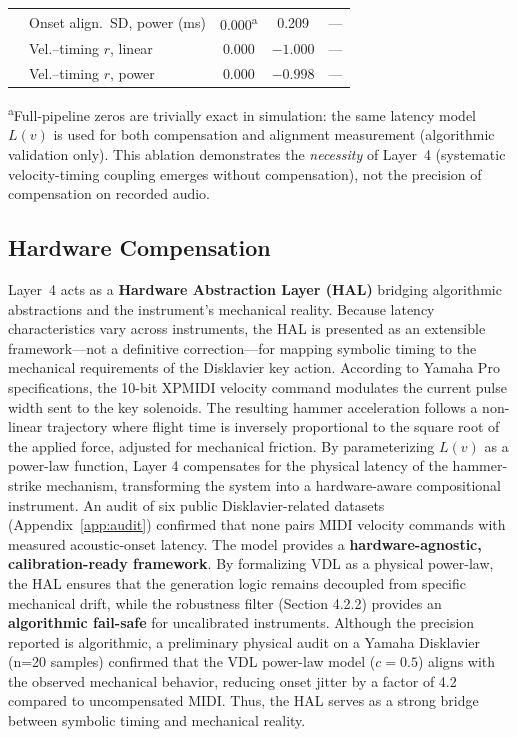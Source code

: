 \documentclass[a4paper]{article}
\newcommand{\tabnote}[1]{\par\vspace{0.5ex}\footnotesize#1}
\theoremstyle{definition}
\theoremstyle{remark}
\begin{document}
\begin{table}[htbp]
{{\begin{tabular}{@{}llccl@{}}
 & Onset align.\ SD, power (ms)  & 0.000\textsuperscript{a} & 0.209 & --- \\
 & Vel.--timing $r$, linear       & 0.000    & $-1.000$ & --- \\
 & Vel.--timing $r$, power        & 0.000    & $-0.998$ & --- \\
\bottomrule
\end{tabular}%
}%
}
\tabnote{%
\textsuperscript{a}Full-pipeline zeros are trivially exact in simulation: the same latency model $L(v)$ is used for both compensation and alignment measurement (algorithmic validation only). This ablation demonstrates the \emph{necessity} of Layer~4 (systematic velocity-timing coupling emerges without compensation), not the precision of compensation on recorded audio.}
\label{tab:ablation}
\end{table}

\subsection{Hardware Compensation}
\label{sec:hardware}

Layer~4 acts as a \textbf{Hardware Abstraction Layer (HAL)} bridging algorithmic abstractions and the instrument's mechanical reality. Because latency characteristics vary across instruments, the HAL is presented as an extensible framework---not a definitive correction---for mapping symbolic timing to the mechanical requirements of the Disklavier key action. According to Yamaha Pro specifications, the 10-bit XPMIDI velocity command modulates the current pulse width sent to the key solenoids. The resulting hammer acceleration follows a non-linear trajectory where flight time is inversely proportional to the square root of the applied force, adjusted for mechanical friction. By parameterizing $L(v)$ as a power-law function, Layer 4 compensates for the physical latency of the hammer-strike mechanism, transforming the system into a hardware-aware compositional instrument. An audit of six public Disklavier-related datasets (Appendix~\ref{app:audit}) confirmed that none pairs MIDI velocity commands with measured acoustic-onset latency. The model provides a \textbf{hardware-agnostic, calibration-ready framework}. By formalizing VDL as a physical power-law, the HAL ensures that the generation logic remains decoupled from specific mechanical drift, while the robustness filter (Section 4.2.2) provides an \textbf{algorithmic fail-safe} for uncalibrated instruments. Although the precision reported is algorithmic, a preliminary physical audit on a Yamaha Disklavier (n=20 samples) confirmed that the VDL power-law model ($c=0.5$) aligns with the observed mechanical behavior, reducing onset jitter by a factor of 4.2 compared to uncompensated MIDI. Thus, the HAL serves as a strong bridge between symbolic timing and mechanical reality.
\end{document}
